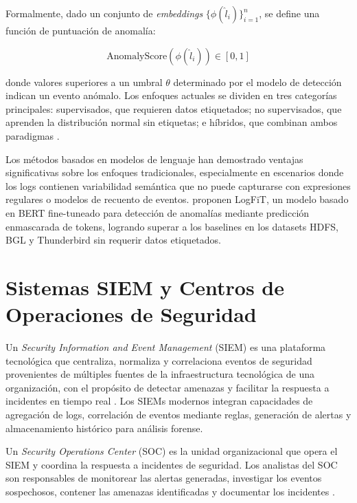 Formalmente, dado un conjunto de \textit{embeddings} $\{\phi(\hat{l}_i)\}_{i=1}^n$, se define una función de puntuación de anomalía:

\begin{equation}
    \text{AnomalyScore}(\phi(\hat{l}_i)) \in [0, 1]
\end{equation}

\noindent donde valores superiores a un umbral $\theta$ determinado por el modelo de detección indican un evento anómalo. Los enfoques actuales se dividen en tres categorías principales: supervisados, que requieren datos etiquetados; no supervisados, que aprenden la distribución normal sin etiquetas; e híbridos, que combinan ambos paradigmas \cite{liu2024logcem}.

Los métodos basados en modelos de lenguaje han demostrado ventajas significativas sobre los enfoques tradicionales, especialmente en escenarios donde los logs contienen variabilidad semántica que no puede capturarse con expresiones regulares o modelos de recuento de eventos. \cite{almodovar2024logfit} proponen LogFiT, un modelo basado en BERT fine-tuneado para detección de anomalías mediante predicción enmascarada de tokens, logrando superar a los baselines en los datasets HDFS, BGL y Thunderbird sin requerir datos etiquetados.

\section{Sistemas SIEM y Centros de Operaciones de Seguridad}

Un \textit{Security Information and Event Management} (SIEM) es una plataforma tecnológica que centraliza, normaliza y correlaciona eventos de seguridad provenientes de múltiples fuentes de la infraestructura tecnológica de una organización, con el propósito de detectar amenazas y facilitar la respuesta a incidentes en tiempo real \cite{kim2026isiem}. Los SIEMs modernos integran capacidades de agregación de logs, correlación de eventos mediante reglas, generación de alertas y almacenamiento histórico para análisis forense.

Un \textit{Security Operations Center} (SOC) es la unidad organizacional que opera el SIEM y coordina la respuesta a incidentes de seguridad. Los analistas del SOC son responsables de monitorear las alertas generadas, investigar los eventos sospechosos, contener las amenazas identificadas y documentar los incidentes \cite{srinivas2025soc}.

